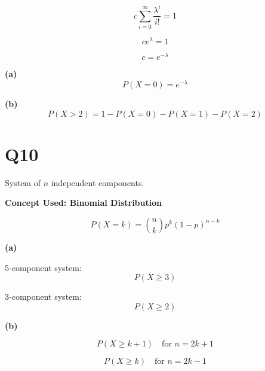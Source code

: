 \documentclass[12pt]{article}
\begin{document}
\[
c \sum_{i=0}^{\infty} \frac{\lambda^i}{i!} = 1
\]

\[
c e^{\lambda} = 1
\]

\[
c = e^{-\lambda}
\]

\textbf{(a)}
\[
P(X=0) = e^{-\lambda}
\]

\textbf{(b)}
\[
P(X>2) = 1 - P(X=0) - P(X=1) - P(X=2)
\]

\newpage
\section*{Q10}

System of $n$ independent components.

\textbf{Concept Used: Binomial Distribution}

\[
P(X=k) = \binom{n}{k} p^k (1-p)^{n-k}
\]

\textbf{(a)}

5-component system:
\[
P(X \ge 3)
\]

3-component system:
\[
P(X \ge 2)
\]

\textbf{(b)}

\[
P(X \ge k+1) \quad \text{for } n=2k+1
\]

\[
P(X \ge k) \quad \text{for } n=2k-1
\]
\end{document}
